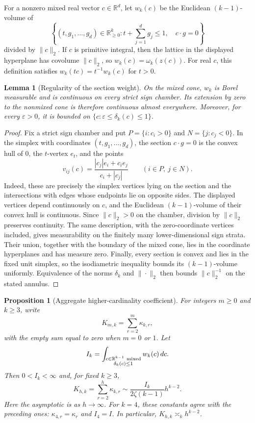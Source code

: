 \documentclass[11pt,reqno]{amsart}
\newtheorem{proposition}[theorem]{Proposition}
\newtheorem{lemma}[theorem]{Lemma}
\theoremstyle{definition}
\theoremstyle{remark}
\begin{document}
For a nonzero mixed real vector $c\in\mathbb R^d$, let $w_k(c)$ be the
Euclidean $(k-1)$-volume of
\[
 \left\{(t,g_1,\ldots,g_d)\in\mathbb R_{\geq0}^{k}:
 t+\sum_{j=1}^dg_j\leq1,\quad c\cdot g=0\right\}
\]
divided by $\|c\|_2$.  If $c$ is primitive integral, then the lattice in
the displayed hyperplane has covolume $\|c\|_2$, so
$w_k(c)=\omega_k(z(c))$.  For real $c$, this definition satisfies
$w_k(tc)=t^{-1}w_k(c)$ for $t>0$.

\begin{lemma}[Regularity of the section weight]
\label{lem:section-weight-regularity}
On the mixed cone, $w_k$ is Borel measurable and is continuous on every
strict sign chamber.  Its extension by zero to the nonmixed cone is therefore
continuous almost everywhere.  Moreover, for every $\varepsilon>0$, it is
bounded on $\{c:\varepsilon\leq\delta_k(c)\leq1\}$.
\end{lemma}

\begin{proof}
Fix a strict sign chamber and put
$P=\{i:c_i>0\}$ and $N=\{j:c_j<0\}$.  In the simplex with coordinates
$(t,g_1,\ldots,g_d)$, the section $c\cdot g=0$ is the convex hull of
$0$, the $t$-vertex $e_t$, and the points
\[
 v_{ij}(c)=
 \frac{|c_j|e_i+c_i e_j}{c_i+|c_j|}
 \qquad(i\in P,\ j\in N).
\]
Indeed, these are precisely the simplex vertices lying on the section and
the intersections with edges whose endpoints lie on opposite sides.  The
displayed vertices depend continuously on $c$, and the Euclidean
$(k-1)$-volume of their convex hull is continuous.  Since $\|c\|_2>0$ on
the chamber, division by $\|c\|_2$ preserves continuity.  The same
description, with the zero-coordinate vertices included, gives measurability
on the finitely many
lower-dimensional sign strata.  Their union, together with the boundary of
the mixed cone, lies in the coordinate hyperplanes and has measure zero.
Finally, every section is convex and lies in the fixed unit simplex, so the
isodiametric inequality bounds its $(k-1)$-volume uniformly.  Equivalence of
the norms $\delta_k$ and $\|\cdot\|_2$ then bounds $\|c\|_2^{-1}$ on the
stated annulus.
\end{proof}

\begin{proposition}[Aggregate higher-cardinality coefficient]
\label{prop:pop-hk-summatory}
For integers $m\geq0$ and $k\geq3$, write
\[
 K_{m,k}=\sum_{r=2}^{m}\kappa_{k,r},
\]
with the empty sum equal to zero when $m=0$ or $1$.
Let
\[
 I_k=\int_{\substack{c\in\mathbb R^{k-1}\ {\rm mixed}\\
                      \delta_k(c)\leq1}}w_k(c)\,dc.
\]
Then $0<I_k<\infty$ and, for fixed $k\geq3$,
\begin{equation}\label{eq:pop-hk-summatory}
 K_{h,k}=\sum_{r=2}^h\kappa_{k,r}
 \sim\frac{I_k}{2\zeta(k-1)}h^{k-2}.
\end{equation}
Here the asymptotic is as $h\to\infty$.  For $k=4$, these constants agree
with the preceding ones: $\kappa_{4,r}=\kappa_r$ and $I_4=I$.
In particular, $K_{h,k}\asymp_k h^{k-2}$.
\end{proposition}
\end{document}
